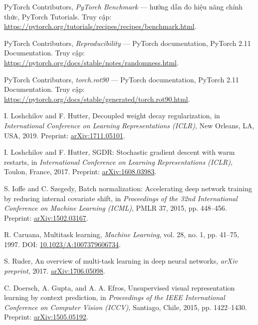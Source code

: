 PyTorch Contributors,
\newblock \emph{PyTorch Benchmark} --- hướng dẫn đo hiệu năng chính thức,
\newblock PyTorch Tutorials.
\newblock Truy cập: \url{https://pytorch.org/tutorials/recipes/recipes/benchmark.html}.

PyTorch Contributors,
\newblock \emph{Reproducibility} --- PyTorch documentation,
\newblock PyTorch 2.11 Documentation.
\newblock Truy cập: \url{https://pytorch.org/docs/stable/notes/randomness.html}.

PyTorch Contributors,
\newblock \emph{torch.rot90} --- PyTorch documentation,
\newblock PyTorch 2.11 Documentation.
\newblock Truy cập: \url{https://pytorch.org/docs/stable/generated/torch.rot90.html}.

I. Loshchilov and F. Hutter,
\newblock Decoupled weight decay regularization,
\newblock in \emph{International Conference on Learning Representations (ICLR)},
  New Orleans, LA, USA, 2019.
\newblock Preprint: \href{https://arxiv.org/abs/1711.05101}{arXiv:1711.05101}.

I. Loshchilov and F. Hutter,
\newblock SGDR: Stochastic gradient descent with warm restarts,
\newblock in \emph{International Conference on Learning Representations (ICLR)},
  Toulon, France, 2017.
\newblock Preprint: \href{https://arxiv.org/abs/1608.03983}{arXiv:1608.03983}.

S. Ioffe and C. Szegedy,
\newblock Batch normalization: Accelerating deep network training by reducing
  internal covariate shift,
\newblock in \emph{Proceedings of the 32nd International Conference on Machine
  Learning (ICML)}, PMLR 37, 2015, pp. 448--456.
\newblock Preprint: \href{https://arxiv.org/abs/1502.03167}{arXiv:1502.03167}.

R. Caruana,
\newblock Multitask learning,
\newblock \emph{Machine Learning}, vol. 28, no. 1, pp. 41--75, 1997.
\newblock DOI: \href{https://doi.org/10.1023/A:1007379606734}{10.1023/A:1007379606734}.

S. Ruder,
\newblock An overview of multi-task learning in deep neural networks,
\newblock \emph{arXiv preprint}, 2017.
\newblock \href{https://arxiv.org/abs/1706.05098}{arXiv:1706.05098}.

C. Doersch, A. Gupta, and A. A. Efros,
\newblock Unsupervised visual representation learning by context prediction,
\newblock in \emph{Proceedings of the IEEE International Conference on Computer
  Vision (ICCV)}, Santiago, Chile, 2015, pp. 1422--1430.
\newblock Preprint: \href{https://arxiv.org/abs/1505.05192}{arXiv:1505.05192}.


